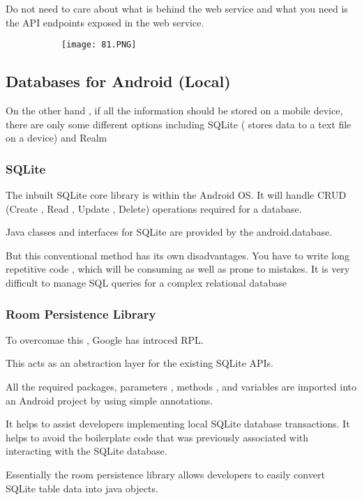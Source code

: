 \documentclass{article}
\begin{document}
Do not need to care about what is behind the web service and what you need is the API endpoints exposed in the web service.

        \begin{figure}[ht!]
  \centering
  \begin{subfigure}[b]{.5\linewidth}
  \texttt{[image: 81.PNG]}
  \end{subfigure}
  \end{figure}

\subsection{Databases for Android (Local)}

On the other hand , if all the information should be stored on a mobile device, there are only some different options including SQLite ( stores data to a text file on a device) and Realm

\subsubsection{SQLite}

The inbuilt SQLite core library is within the Android OS. It will handle CRUD (Create , Read , Update , Delete) operations required for a database.

Java classes and interfaces for SQLite are provided by the android.database.

But this conventional method has its own disadvantages. You have to write long repetitive code , which will be consuming as well as prone to mistakes. It is very difficult to manage SQL queries for a complex relational database

\subsubsection{Room Persistence Library}

To overcomae this , Google has introced RPL.

This acts as an abstraction layer for the existing SQLite APIs.

All the required packages, parameters , methods , and variables are imported into an Android project by using simple annotations.

It helps to assist developers implementing local SQLite database transactions. It helps to avoid the boilerplate code that was previously associated with interacting with the SQLite database. 

Essentially the room persistence library allows developers to easily convert SQLite table data into java objects.
\end{document}
